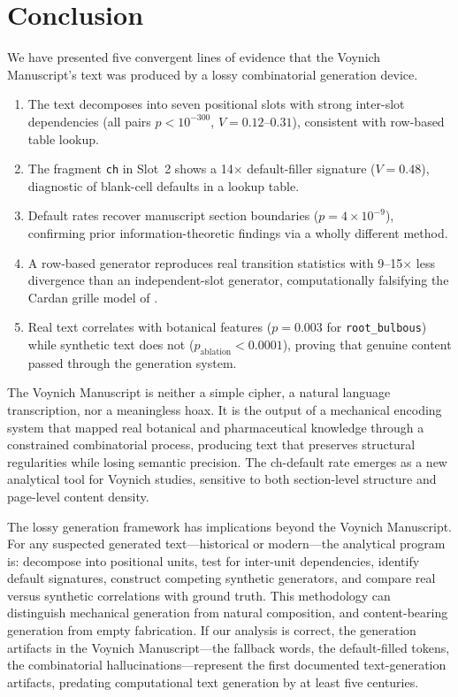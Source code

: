 \documentclass[12pt]{article}
\begin{document}
\section{Conclusion}
\label{sec:conclusion}

We have presented five convergent lines of evidence that the Voynich Manuscript's text was produced by a lossy combinatorial generation device.

\begin{enumerate}
  \item The text decomposes into seven positional slots with strong inter-slot dependencies (all pairs $p < 10^{-300}$, $V = 0.12$--$0.31$), consistent with row-based table lookup.
  \item The fragment \texttt{ch} in Slot~2 shows a 14$\times$ default-filler signature ($V = 0.48$), diagnostic of blank-cell defaults in a lookup table.
  \item Default rates recover manuscript section boundaries ($p = 4 \times 10^{-9}$), confirming prior information-theoretic findings via a wholly different method.
  \item A row-based generator reproduces real transition statistics with 9--15$\times$ less divergence than an independent-slot generator, computationally falsifying the Cardan grille model of \citet{Rugg2004}.
  \item Real text correlates with botanical features ($p = 0.003$ for \texttt{root\_bulbous}) while synthetic text does not ($p_{\text{ablation}} < 0.0001$), proving that genuine content passed through the generation system.
\end{enumerate}

The Voynich Manuscript is neither a simple cipher, a natural language transcription, nor a meaningless hoax. It is the output of a mechanical encoding system that mapped real botanical and pharmaceutical knowledge through a constrained combinatorial process, producing text that preserves structural regularities while losing semantic precision. The ch-default rate emerges as a new analytical tool for Voynich studies, sensitive to both section-level structure and page-level content density.

The lossy generation framework has implications beyond the Voynich Manuscript. For any suspected generated text---historical or modern---the analytical program is: decompose into positional units, test for inter-unit dependencies, identify default signatures, construct competing synthetic generators, and compare real versus synthetic correlations with ground truth. This methodology can distinguish mechanical generation from natural composition, and content-bearing generation from empty fabrication. If our analysis is correct, the generation artifacts in the Voynich Manuscript---the fallback words, the default-filled tokens, the combinatorial hallucinations---represent the first documented text-generation artifacts, predating computational text generation by at least five centuries.
\end{document}
